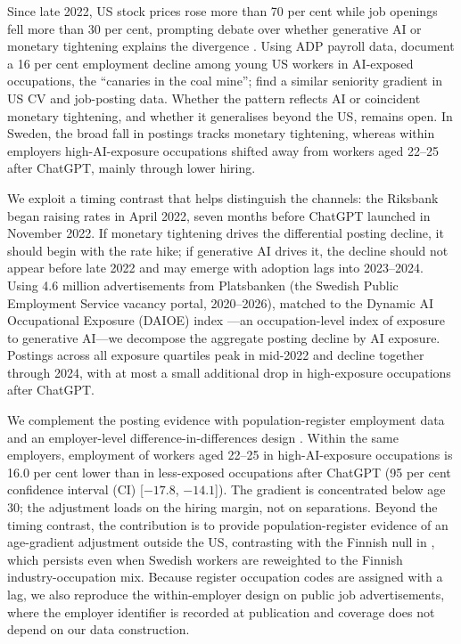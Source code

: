 \documentclass[preprint,12pt,authoryear]{elsarticle}
\begin{document}
Since late 2022, US stock prices rose more than 70 per cent while job openings fell more than 30 per cent, prompting debate over whether generative AI or monetary tightening explains the divergence \citep{thompson2025scary}. Using ADP payroll data, \citet{brynjolfsson2025canaries} document a 16 per cent employment decline among young US workers in AI-exposed occupations, the ``canaries in the coal mine''; \citet{hosseini2025seniority} find a similar seniority gradient in US CV and job-posting data. Whether the pattern reflects AI or coincident monetary tightening, and whether it generalises beyond the US, remains open. In Sweden, the broad fall in postings tracks monetary tightening, whereas within employers high-AI-exposure occupations shifted away from workers aged 22--25 after ChatGPT, mainly through lower hiring.

We exploit a timing contrast that helps distinguish the channels: the Riksbank began raising rates in April 2022, seven months before ChatGPT launched in November 2022. If monetary tightening drives the differential posting decline, it should begin with the rate hike; if generative AI drives it, the decline should not appear before late 2022 and may emerge with adoption lags into 2023--2024. Using 4.6 million advertisements from Platsbanken (the Swedish Public Employment Service vacancy portal, 2020--2026), matched to the Dynamic AI Occupational Exposure (DAIOE) index \citep{engberg2024daioe}---an occupation-level index of exposure to generative AI---we decompose the aggregate posting decline by AI exposure. Postings across all exposure quartiles peak in mid-2022 and decline together through 2024, with at most a small additional drop in high-exposure occupations after ChatGPT.

We complement the posting evidence with population-register employment data and an employer-level difference-in-differences design \citep{brynjolfsson2025canaries}. Within the same employers, employment of workers aged 22--25 in high-AI-exposure occupations is 16.0 per cent lower than in less-exposed occupations after ChatGPT (95 per cent confidence interval (CI) [$-17.8$, $-14.1$]). The gradient is concentrated below age 30; the adjustment loads on the hiring margin, not on separations. Beyond the timing contrast, the contribution is to provide population-register evidence of an age-gradient adjustment outside the US, contrasting with the Finnish null in \citet{kauhanen2026youth}, which persists even when Swedish workers are reweighted to the Finnish industry-occupation mix. Because register occupation codes are assigned with a lag, we also reproduce the within-employer design on public job advertisements, where the employer identifier is recorded at publication and coverage does not depend on our data construction.
\end{document}
